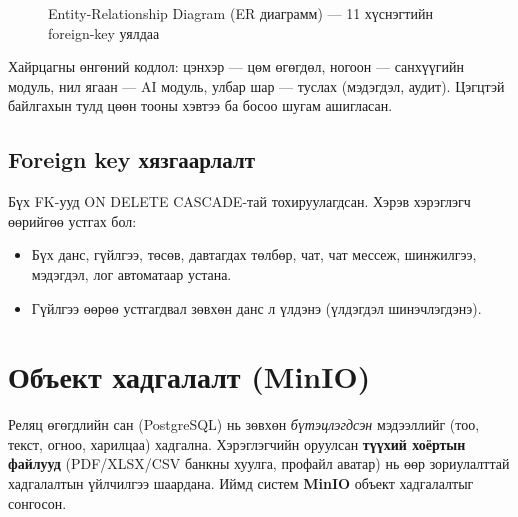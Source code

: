 \begin{figure}[ht]
{
}
\caption{Entity-Relationship Diagram (ER диаграмм) --- 11 хүснэгтийн foreign-key уялдаа}
\label{fig:erd}
\end{figure}

Хайрцагны өнгөний кодлол: цэнхэр --- цөм өгөгдөл, ногоон --- санхүүгийн модуль, нил ягаан --- AI модуль, улбар шар --- туслах (мэдэгдэл, аудит). Цэгцтэй байлгахын тулд цөөн тооны хэвтээ ба босоо шугам ашигласан.

\subsection{Foreign key хязгаарлалт}
Бүх FK-ууд ON DELETE CASCADE-тай тохируулагдсан. Хэрэв хэрэглэгч өөрийгөө устгах бол:
\begin{itemize}
    \item Бүх данс, гүйлгээ, төсөв, давтагдах төлбөр, чат, чат мессеж, шинжилгээ, мэдэгдэл, лог автоматаар устана.
    \item Гүйлгээ өөрөө устгагдвал зөвхөн данс л үлдэнэ (үлдэгдэл шинэчлэгдэнэ).
\end{itemize}

\section{Объект хадгалалт (MinIO)}
\label{sec:minio}
Реляц өгөгдлийн сан (PostgreSQL) нь зөвхөн \emph{бүтэцлэгдсэн} мэдээллийг (тоо, текст, огноо, харилцаа) хадгална. Хэрэглэгчийн оруулсан \textbf{түүхий хоёртын файлууд} (PDF/XLSX/CSV банкны хуулга, профайл аватар) нь өөр зориулалттай хадгалалтын үйлчилгээ шаардана. Иймд систем \textbf{MinIO} \cite{minio} объект хадгалалтыг сонгосон.

